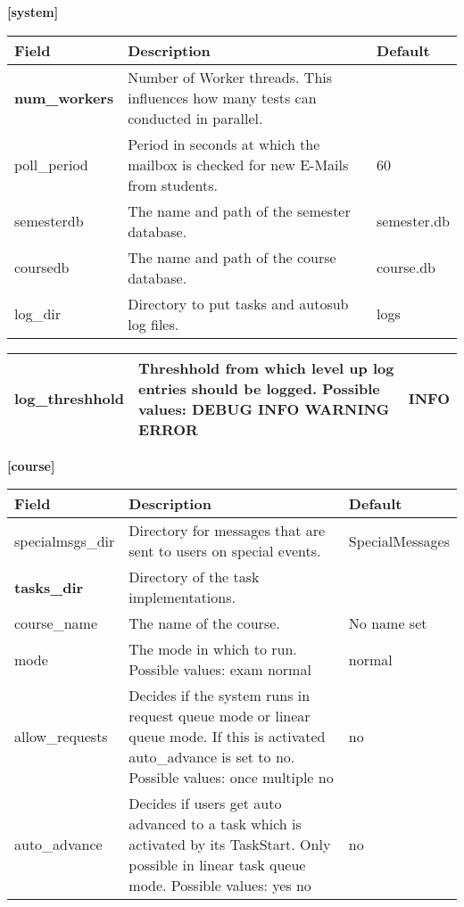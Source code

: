 {\bf [system]}\\
\begin{tabular}{|p{2.5cm}|p{8cm}|p{2.5cm}|}
\hline
{\bf Field} & {\bf Description} & {\bf Default}\\
\hline
\hline
\textbf{num\_workers} & Number of Worker threads. This influences how many tests can conducted
    in parallel. & ~ \\
\hline
poll\_period & Period in seconds at which the mailbox is checked for new E-Mails from students. & 60\\
\hline
semesterdb & The name and path of the semester database. & semester.db\\
\hline
coursedb &  The name and path of the course database. & course.db\\
\hline
log\_dir & Directory to put tasks and autosub log files. & logs  \\
\hline
\end{tabular}
\begin{tabular}{|p{2.5cm}|p{8cm}|p{2.5cm}|}
\hline
log\_threshhold & Threshhold from which level up log entries should be logged.
    Possible values: DEBUG INFO WARNING ERROR & INFO\\
\hline
\end{tabular}

{\bf [course]}\\
\begin{tabular}{|p{2.5cm}|p{8cm}|p{2.5cm}|}
\hline
{\bf Field} & {\bf Description} & {\bf Default}\\
\hline
\hline
specialmsgs\_dir & Directory for messages that are sent to users on special events. &
    SpecialMessages \\
\hline
\textbf{tasks\_dir} & Directory of the task implementations. & ~ \\
\hline
course\_name & The name of the course. & No name set \\
\hline
mode & The mode in which to run. Possible values: exam normal & normal \\
\hline
allow\_requests & Decides if the system runs in request queue mode or linear queue mode. If this is activated
    auto\_advance is set to no. Possible values: once multiple no & no \\
\hline
auto\_advance & Decides if users get auto advanced to a task which is activated by its
    TaskStart. Only possible in linear task queue mode. Possible values: yes no & no \\
\hline
\end{tabular}

